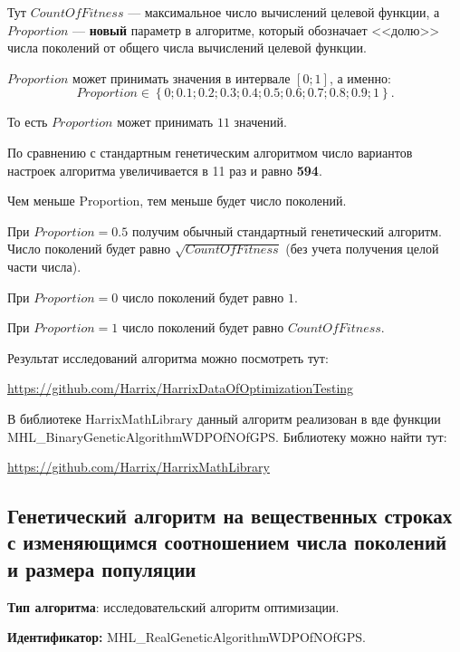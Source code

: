 \documentclass[a4paper,12pt]{article}
\begin{document}
Тут $CountOfFitness$ --- максимальное число вычислений целевой функции, а $Proportion$ --- \textbf{новый} параметр в алгоритме, который обозначает <<долю>> числа поколений от общего числа вычислений целевой функции.

$Proportion$ может принимать значения в интервале $ [0;1] $, а именно:
\begin{equation}
Proportion \in \left\lbrace 0; 0.1; 0.2; 0.3; 0.4; 0.5; 0.6; 0.7; 0.8; 0.9; 1\right\rbrace .
\end{equation}

То есть $Proportion$ может принимать $ 11 $ значений.

По сравнению с стандартным генетическим алгоритмом число вариантов настроек алгоритма увеличивается в 11 раз и равно \textbf{594}.

Чем меньше Proportion, тем меньше будет число поколений.

При $ Proportion=0.5 $ получим обычный стандартный генетический алгоритм. Число поколений будет равно $ \sqrt{CountOfFitness}$ (без учета получения целой части числа).

При $ Proportion=0 $ число поколений будет равно $ 1 $.

При $ Proportion=1 $ число поколений будет равно $ CountOfFitness $.

Результат исследований алгоритма можно посмотреть тут:

\href{https://github.com/Harrix/HarrixDataOfOptimizationTesting}{https://github.com/Harrix/HarrixDataOfOptimizationTesting}

В библиотеке HarrixMathLibrary данный алгоритм реализован в вде функции MHL\_BinaryGeneticAlgorithmWDPOfNOfGPS. Библиотеку можно найти тут:

\href{https://github.com/Harrix/HarrixMathLibrary}{https://github.com/Harrix/HarrixMathLibrary}

\subsection{Генетический алгоритм на вещественных строках с изменяющимся соотношением числа поколений и размера популяции}\label{HarrixOptimizationAlgorithms:GA001}

\textbf{Тип алгоритма}: исследовательский алгоритм оптимизации.

\textbf{Идентификатор:} MHL\_RealGeneticAlgorithmWDPOfNOfGPS.
\end{document}
